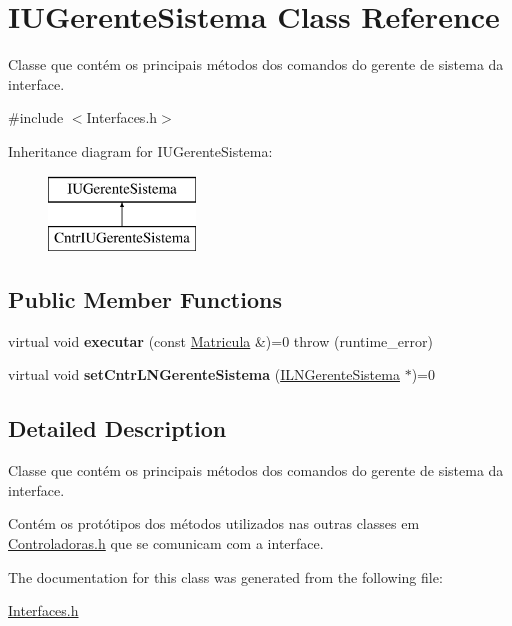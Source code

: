 \hypertarget{class_i_u_gerente_sistema}{}\section{I\+U\+Gerente\+Sistema Class Reference}
\label{class_i_u_gerente_sistema}


Classe que contém os principais métodos dos comandos do gerente de sistema da interface.  




{\ttfamily \#include $<$Interfaces.\+h$>$}

Inheritance diagram for I\+U\+Gerente\+Sistema\+:\begin{figure}[H]
\begin{center}
\leavevmode
\includegraphics[height=2.000000cm]{class_i_u_gerente_sistema}
\end{center}
\end{figure}
\subsection*{Public Member Functions}
\begin{DoxyCompactItemize}
\item 
\hypertarget{class_i_u_gerente_sistema_ae9f231069ed7ff34998605a4c4396e37}{}\label{class_i_u_gerente_sistema_ae9f231069ed7ff34998605a4c4396e37} 
virtual void {\bfseries executar} (const \hyperlink{class_matricula}{Matricula} \&)=0  throw (runtime\+\_\+error)
\item 
\hypertarget{class_i_u_gerente_sistema_afe66d7bf2068a5f06e58310802479507}{}\label{class_i_u_gerente_sistema_afe66d7bf2068a5f06e58310802479507} 
virtual void {\bfseries set\+Cntr\+L\+N\+Gerente\+Sistema} (\hyperlink{class_i_l_n_gerente_sistema}{I\+L\+N\+Gerente\+Sistema} $\ast$)=0
\end{DoxyCompactItemize}


\subsection{Detailed Description}
Classe que contém os principais métodos dos comandos do gerente de sistema da interface. 

Contém os protótipos dos métodos utilizados nas outras classes em \hyperlink{_controladoras_8h}{Controladoras.\+h} que se comunicam com a interface. 

The documentation for this class was generated from the following file\+:\begin{DoxyCompactItemize}
\item 
\hyperlink{_interfaces_8h}{Interfaces.\+h}\end{DoxyCompactItemize}
